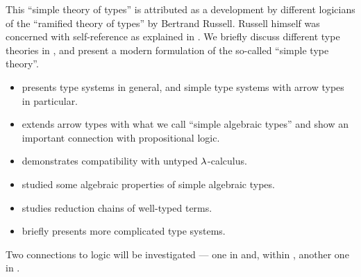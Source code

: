 This \enquote{simple theory of types} is attributed as a development by different logicians of the \enquote{ramified theory of types} by Bertrand Russell. Russell himself was concerned with self-reference as explained in . We briefly discuss different type theories in , and present a modern formulation of the so-called \enquote{simple type theory}.

\begin{itemize}
  \item {} presents type systems in general, and simple type systems with arrow types in particular.
  \item {} extends arrow types with what we call \enquote{simple algebraic types} and show an important connection with propositional logic.
  \item {} demonstrates compatibility with untyped \( {\mathrm \lambda} \)-calculus.
  \item {} studied some algebraic properties of simple algebraic types.
  \item {} studies reduction chains of well-typed terms.
  \item {} briefly presents more complicated type systems.
\end{itemize}

Two connections to logic will be investigated --- one in  and, within , another one in .
